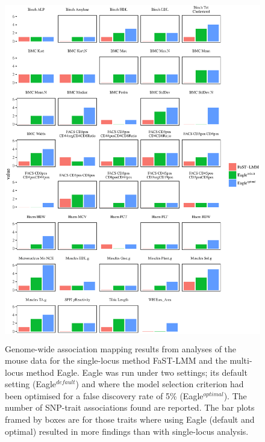 \documentclass{nature}
\begin{document}
\begin{figure}
\caption{Genome-wide association mapping results from analyses of the mouse data for the single-locus method FaST-LMM and the 
multi-locus method
Eagle. Eagle was run under two settings; its default setting (Eagle$^{default}$) and where the model selection criterion had been optimised 
for a false discovery rate of 5\% (Eagle$^{optimal}$). 
The number of SNP-trait associations found are reported. The bar plots framed by boxes are for those traits where using Eagle (default and optimal)   resulted in more findings than with single-locus analysis.} 
\label{figmouse}
\begin{center}
\includegraphics[width=15cm, height=15cm]{mouseresults.eps}
\end{center}

\end{figure}




 
\end{document}
